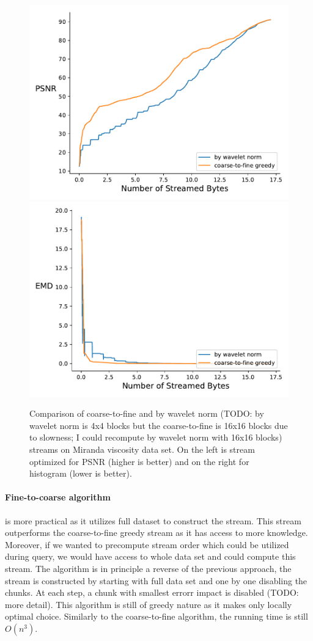 \begin{figure}
        \centering
        \includegraphics[width=0.48\linewidth]{img/figure4/rmse-miranda-viscosity}
        \includegraphics[width=0.48\linewidth]{img/figure4/histogram-miranda-viscosity}
        \caption{Comparison of coarse-to-fine and by wavelet norm (TODO: by wavelet norm is 4x4 blocks but the coarse-to-fine is 16x16 blocks due to slowness; I could recompute by wavelet norm with 16x16 blocks) streams on Miranda viscosity data set.
                 On the left is stream optimized for PSNR (higher is better) and on the right for histogram (lower is better).}
\end{figure}

\paragraph*{Fine-to-coarse algorithm} is more practical as it utilizes full dataset to construct the stream.
This stream outperforms the coarse-to-fine greedy stream as it has access to more knowledge. Moreover,
if we wanted to precompute stream order which could be utilized during query, we would have access to whole
data set and could compute this stream. The algorithm is in principle a reverse of the previous approach, the
stream is constructed by starting with full data set and one by one disabling the chunks. At each step, a chunk
with smallest errorr impact is disabled (TODO: more detail). This algorithm is still of greedy nature as it
makes only locally optimal choice. Similarly to the coarse-to-fine algorithm, the running time is still $O(n^3)$.

